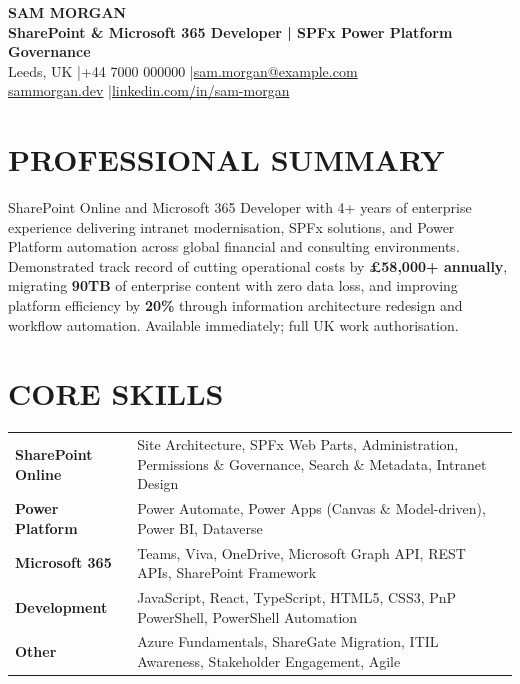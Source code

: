 \documentclass[11pt,a4paper]{article}
\begin{document}
\begin{center}
    {\Huge \textbf{SAM MORGAN}} \\ \vspace{6pt}
    {\large \textbf{SharePoint \& Microsoft 365 Developer | SPFx \textbullet{} Power Platform \textbullet{} Governance}} \\ \vspace{8pt}
    Leeds, UK \quad|\quad +44 7000 000000 \quad|\quad \href{mailto:sam.morgan@example.com}{sam.morgan@example.com} \\ \vspace{4pt}
    \href{https://sammorgan.dev}{sammorgan.dev} \quad|\quad \href{https://linkedin.com/in/sam-morgan}{linkedin.com/in/sam-morgan}
\end{center}

\section*{PROFESSIONAL SUMMARY}
SharePoint Online and Microsoft 365 Developer with 4+ years of enterprise experience delivering intranet modernisation, SPFx solutions, and Power Platform automation across global financial and consulting environments. Demonstrated track record of cutting operational costs by \textbf{\pounds58,000+ annually}, migrating \textbf{90TB} of enterprise content with zero data loss, and improving platform efficiency by \textbf{20\%} through information architecture redesign and workflow automation. Available immediately; full UK work authorisation.

\section*{CORE SKILLS}
\begin{tabularx}{\textwidth}{@{}l X@{}}
\textbf{SharePoint Online} & Site Architecture, SPFx Web Parts, Administration, Permissions \& Governance, Search \& Metadata, Intranet Design \\
\textbf{Power Platform} & Power Automate, Power Apps (Canvas \& Model-driven), Power BI, Dataverse \\
\textbf{Microsoft 365} & Teams, Viva, OneDrive, Microsoft Graph API, REST APIs, SharePoint Framework \\
\textbf{Development} & JavaScript, React, TypeScript, HTML5, CSS3, PnP PowerShell, PowerShell Automation \\
\textbf{Other} & Azure Fundamentals, ShareGate Migration, ITIL Awareness, Stakeholder Engagement, Agile \\
\end{tabularx}
\end{document}
